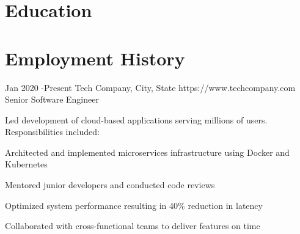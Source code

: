 \documentclass[10pt]{article} %
\begin{document}

\section{Education}





\section{Employment History}

\job
{Jan 2020 -}{Present}
{Tech Company, City, State}
{https://www.techcompany.com}
{Senior Software Engineer}
{Led development of cloud-based applications serving millions of users. Responsibilities included:
\begin{itemize-noindent}
\item{Architected and implemented microservices infrastructure using Docker and Kubernetes}
\item{Mentored junior developers and conducted code reviews}
\item{Optimized system performance resulting in 40\% reduction in latency}
\item{Collaborated with cross-functional teams to deliver features on time}
\end{itemize-noindent}}
\end{document}
